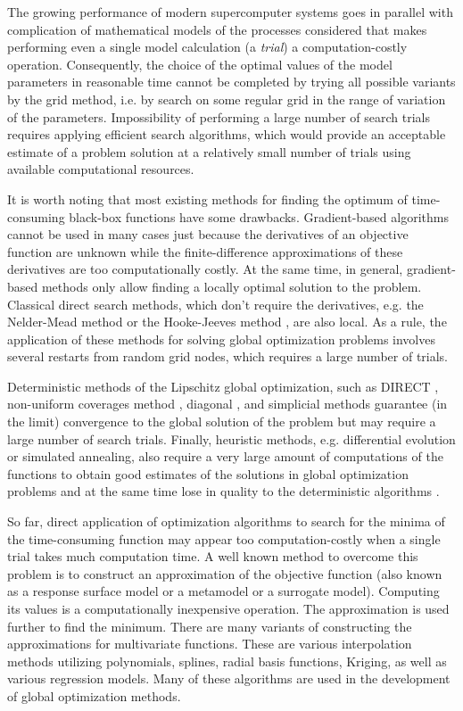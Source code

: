 \documentclass[mathematics,article,submit,pdftex,moreauthors]{Definitions/mdpi}
\begin{document}
The growing performance of modern supercomputer systems goes in parallel with complication of mathematical models of the processes considered that makes performing even a single model calculation (a \textit{trial}) a computation-costly operation. Consequently, the choice of the optimal values of the model parameters in reasonable time cannot be completed by trying all possible variants by the grid method, i.e. by search on some regular grid in the range of variation of the parameters. Impossibility of performing a large number of search trials requires applying efficient search algorithms, which would provide an acceptable estimate of a problem solution at a relatively small number of trials using available computational resources.

It is worth noting that most existing methods for finding the optimum of time-consuming black-box functions have some drawbacks. Gradient-based algorithms cannot be used in many cases just because the derivatives of an objective function are unknown while the finite-difference approximations of these derivatives are too computationally costly. At the same time, in general, gradient-based methods only allow finding a locally optimal solution to the problem.
Classical direct search methods, which don't require the derivatives, e.g. the Nelder-Mead method \cite{NelderMead} or the Hooke-Jeeves method \cite{HookJeeves}, are also local. As a rule, the application of these methods for solving global optimization problems involves several restarts from random grid nodes,  which requires a large number of trials. 

Deterministic methods of the Lipschitz global optimization, such as DIRECT \cite{Jones2009}, non-uniform coverages method \cite{Evtushenko2009, Evtushenko2013}, diagonal \cite{Sergeyev2017}, and simplicial \cite{Zilinskas2014} methods guarantee (in the limit) convergence to the global solution of the problem but may require a large number of search trials.
Finally, heuristic methods, e.g. differential evolution or simulated annealing, also require a very large amount of computations of the functions to obtain good estimates of the solutions in global optimization problems and at the same time lose in quality to the deterministic algorithms \cite{Sergeyev2018,Kvasov2018}.

So far, direct application of optimization algorithms to search for the minima of the time-consuming function may appear too computation-costly when a single trial takes much computation time. 
A well known method to overcome this problem is to construct an approximation of the objective function (also known as a response surface model or a metamodel or a surrogate model). Computing its values is a computationally inexpensive operation. The approximation is used further to find the minimum.
There are many variants of constructing the approximations for multivariate functions. These are various interpolation methods utilizing polynomials, splines, radial basis functions, Kriging, as well as various regression models. Many of these algorithms are used in the development of global optimization methods.
\end{document}
